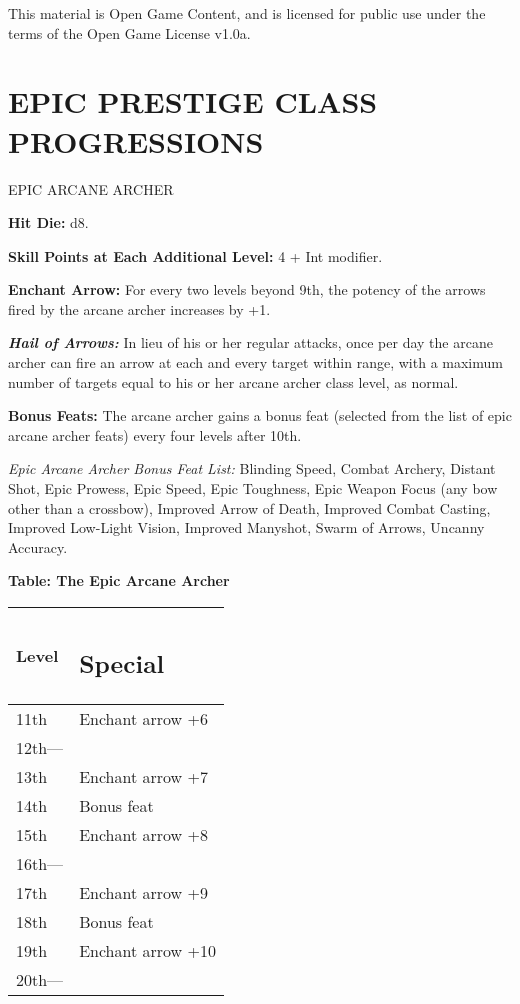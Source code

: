\documentclass{article}
\begin{document}
This material is Open Game Content, and is licensed for public use under the terms 
of the Open Game License v1.0a.

\section*{{\LARGE{}EPIC PRESTIGE CLASS PROGRESSIONS}}

\vspace{12pt}
{\LARGE{}EPIC ARCANE ARCHER }

\textbf{Hit Die:} d8. 

\textbf{Skill Points at Each Additional Level:} 4 + Int modifier. 

\textbf{Enchant Arrow:} For every two levels beyond 9th, the potency of the arrows 
fired by the arcane archer increases by +1. 

\textit{\textbf{Hail of Arrows:}}\textit{ }In lieu of his or her regular attacks, 
once per day the arcane archer can fire an arrow at each and every target within 
range, with a maximum number of targets equal to his or her arcane archer class 
level, as normal. 

\textbf{Bonus Feats:} The arcane archer gains a bonus feat (selected from the list 
of epic arcane archer feats) every four levels after 10th. 

\textit{Epic Arcane Archer Bonus Feat List: }Blinding Speed, Combat Archery, Distant 
Shot, Epic Prowess, Epic Speed, Epic Toughness, Epic Weapon Focus (any bow other 
than a crossbow), Improved Arrow of Death, Improved Combat Casting, Improved Low-Light 
Vision, Improved Manyshot, Swarm of Arrows, Uncanny Accuracy. 

\textbf{Table: The Epic Arcane Archer }

\begin{tabular}{|>{\raggedright}p{27pt}|>{\raggedright}p{83pt}|}
\hline
L\textbf{evel} & \subsection*{S\textbf{pecial }}\tabularnewline
\hline
11th & Enchant arrow +6 \tabularnewline
\hline
12th--- &  \tabularnewline
\hline
13th & Enchant arrow +7 \tabularnewline
\hline
14th & Bonus feat \tabularnewline
\hline
15th & Enchant arrow +8 \tabularnewline
\hline
16th--- &  \tabularnewline
\hline
17th & Enchant arrow +9 \tabularnewline
\hline
18th & Bonus feat \tabularnewline
\hline
19th & Enchant arrow +10 \tabularnewline
\hline
20th--- &  \tabularnewline
\hline
\end{tabular}
\end{document}
